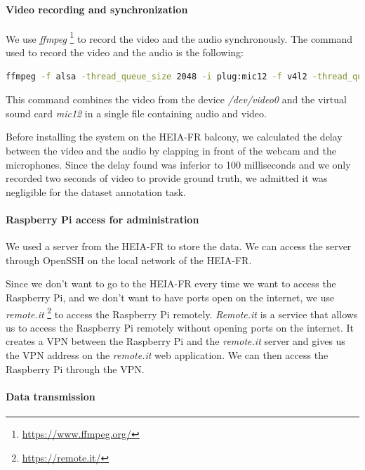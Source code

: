 \paragraph{Video recording and synchronization}

We use \textit{ffmpeg} \footnote{\url{https://www.ffmpeg.org/}} to record the video and the audio synchronously. The command used to record the video and the audio is the following:

\begin{lstlisting}[language=bash]
    ffmpeg -f alsa -thread_queue_size 2048 -i plug:mic12 -f v4l2 -thread_queue_size 2048 -input_format mjpeg -video_size 600x400 -i /dev/video0 -c:a aac -map 0:a -map 1:v -segment_time 00:10:00 -f segment /mnt/videos/$current_date/output%05d.mp4
\end{lstlisting}

This command combines the video from the device \textit{/dev/video0} and the virtual sound card \textit{mic12} in a single file containing audio and video.

Before installing the system on the HEIA-FR balcony, we calculated the delay between the video and the audio by clapping in front of the webcam and the microphones. Since the delay found was inferior to 100 milliseconds and we only recorded two seconds of video to provide ground truth, we admitted it was negligible for the dataset annotation task.

\paragraph{Raspberry Pi access for administration}

We used a server from the HEIA-FR to store the data. We can access the server through OpenSSH on the local network of the HEIA-FR.

Since we don't want to go to the HEIA-FR every time we want to access the Raspberry Pi, and we don't want to have ports open on the internet, we use \textit{remote.it} \footnote{\url{https://remote.it/}} to access the Raspberry Pi remotely. \textit{Remote.it} is a service that allows us to access the Raspberry Pi remotely without opening ports on the internet. It creates a VPN between the Raspberry Pi and the \textit{remote.it} server and gives us the VPN address on the \textit{remote.it} web application. We can then access the Raspberry Pi through the VPN.


\paragraph{Data transmission}

